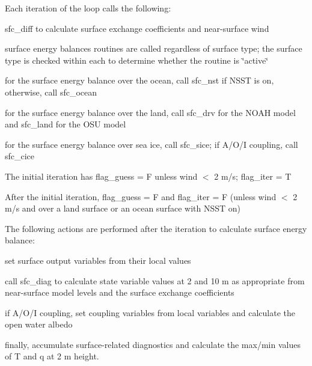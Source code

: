 \begin{DoxyItemize}
\item Each iteration of the loop calls the following\+:
\begin{DoxyItemize}
\item \textquotesingle{}sfc\+\_\+diff\textquotesingle{} to calculate surface exchange coefficients and near-\/surface wind
\item surface energy balances routines are called regardless of surface type; the surface type is checked within each to determine whether the routine is \char`\"{}active\char`\"{}
\item for the surface energy balance over the ocean, call \textquotesingle{}sfc\+\_\+nst\textquotesingle{} if N\+S\+ST is on, otherwise, call \textquotesingle{}sfc\+\_\+ocean\textquotesingle{}
\item for the surface energy balance over the land, call \textquotesingle{}sfc\+\_\+drv\textquotesingle{} for the N\+O\+AH model and \textquotesingle{}sfc\+\_\+land\textquotesingle{} for the O\+SU model
\item for the surface energy balance over sea ice, call sfc\+\_\+sice; if A/\+O/I coupling, call sfc\+\_\+cice
\end{DoxyItemize}
\item The initial iteration has flag\+\_\+guess = F unless wind $<$ 2 m/s; flag\+\_\+iter = T
\item After the initial iteration, flag\+\_\+guess = F and flag\+\_\+iter = F (unless wind $<$ 2 m/s and over a land surface or an ocean surface with N\+S\+ST on)
\item The following actions are performed after the iteration to calculate surface energy balance\+:
\begin{DoxyItemize}
\item set surface output variables from their local values
\item call \textquotesingle{}sfc\+\_\+diag\textquotesingle{} to calculate state variable values at 2 and 10 m as appropriate from near-\/surface model levels and the surface exchange coefficients
\item if A/\+O/I coupling, set coupling variables from local variables and calculate the open water albedo
\item finally, accumulate surface-\/related diagnostics and calculate the max/min values of T and q at 2 m height.
\end{DoxyItemize}
\end{DoxyItemize}

